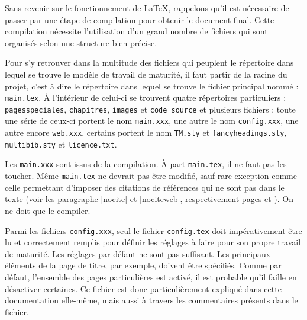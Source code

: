 Sans revenir sur le fonctionnement de \LaTeX, rappelons qu'il est nécessaire de passer par une étape de compilation pour obtenir le document final. Cette compilation nécessite l'utilisation d'un grand nombre de fichiers qui sont organisés selon une structure bien précise.


Pour s'y retrouver dans la multitude des fichiers qui peuplent le répertoire dans lequel se trouve le modèle de travail de maturité, il faut partir de la racine du projet, c'est à dire le répertoire dans lequel se trouve le fichier principal nommé : \verb|main.tex|. À l'intérieur de celui-ci se trouvent quatre répertoires particuliers : \verb|pagesspeciales|, \verb|chapitres|, \verb|images| et \verb|code_source| et plusieurs fichiers : toute une série de ceux-ci portent le nom \verb|main.xxx|, une autre le nom \verb|config.xxx|, une autre encore \verb|web.xxx|, certains portent le nom \verb|TM.sty| et \verb|fancyheadings.sty|, \verb|multibib.sty| et \verb|licence.txt|.

Les \verb|main.xxx| sont issus de la compilation. À part \verb|main.tex|, il ne faut pas les toucher. Même \verb|main.tex| ne devrait pas être modifié, sauf rare exception comme celle permettant d'imposer des citations de références qui ne sont pas dans le texte (voir les paragraphe \ref{nocite} et \ref{nociteweb}, respectivement pages \pageref{nocite} et \pageref{nociteweb}). On ne doit que le compiler.

Parmi les fichiers \verb|config.xxx|, seul le fichier \verb|config.tex| doit impérativement être lu et correctement remplis pour définir les réglages à faire pour son propre travail de maturité. Les réglages par défaut ne sont pas suffisant. Les principaux éléments de la page de titre, par exemple, doivent être spécifiés. Comme par défaut, l'ensemble des pages particulières est activé, il est probable qu'il faille en désactiver certaines. Ce fichier est donc particulièrement expliqué dans cette documentation elle-même, mais aussi à travers les commentaires présents dans le fichier.

